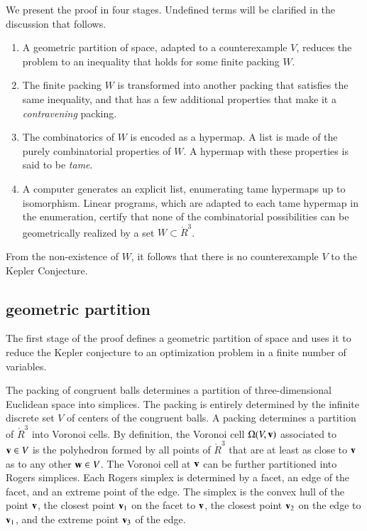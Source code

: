 We present the proof in four stages.  Undefined terms will be clarified in the
discussion that follows.

\begin{enumerate}
\item A geometric partition of space, adapted to a counterexample $V$, 
reduces the problem to an inequality that holds for some finite packing $W$.
\item The finite packing $W$ is transformed into another packing that satisfies the same
inequality, and that has a few additional properties that make it a {\it contravening} packing.
\item The combinatorics of $W$ is encoded as a hypermap.  A list is
  made of the purely combinatorial properties of $W$.  A hypermap with
  these properties is said to be {\it tame}.
\item A computer generates an explicit list, enumerating
  tame hypermaps up to isomorphism.  Linear programs, which are
  adapted to each tame hypermap in the enumeration, certify that
  none of the combinatorial possibilities can be geometrically realized by a set
  $W\subset \ring{R}^3$.
\end{enumerate}

From the non-existence of $W$, it follows that there is no
counterexample $V$ to the Kepler Conjecture.



\subsection{geometric partition}

The first stage of the proof defines a geometric partition of space
and uses it to reduce the Kepler conjecture to an optimization problem
in a finite number of variables.

The packing of congruent balls determines a partition of
three-dimensional Euclidean space into simplices.  The packing is
entirely determined by the infinite discrete set $V$ of centers of the
congruent balls.  A packing determines a partition of $\ring{R}^3$
into Voronoi cells.  By definition, the Voronoi cell $\Omega(V,{\mathbf v})$
associated to ${\mathbf v}\in V$ is the polyhedron formed by all points of
$\ring{R}^3$ that are at least as close to ${\mathbf v}$ as to any other ${\mathbf w}\in
V$.  The Voronoi cell at ${\mathbf v}$ can be further partitioned into Rogers
simplices.  Each Rogers simplex is determined by a facet, an edge of
the facet, and an extreme point of the edge.  The simplex is the
convex hull of the point ${\mathbf v}$, the closest point ${\mathbf v}_1$ on the facet
to ${\mathbf v}$, the closest point ${\mathbf v}_2$ on the edge to ${\mathbf v}_1$, and the
extreme point ${\mathbf v}_3$ of the edge.


